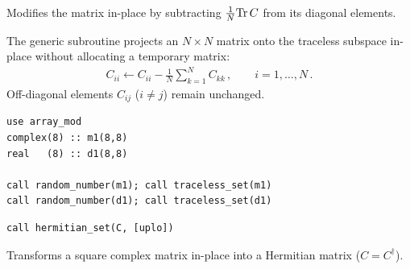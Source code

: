 Modifies the matrix  in-place by subtracting $\frac{1}{N}{\rm Tr\,} C$ from its diagonal elements.

The generic subroutine  projects an $N\times N$ matrix  onto the traceless subspace in-place without allocating a temporary matrix:
\begin{align}
  C_{ii} \leftarrow C_{ii} - \frac{1}{N}\sum_{k=1}^{N} C_{kk}\, , \qquad i = 1,\ldots,N\, .
\end{align}
Off-diagonal elements $C_{ij}$ ($i\neq j$) remain unchanged.

\begin{description}[leftmargin=2.2cm, style=nextline]
\end{description}

\lstset{language=[95]Fortran}
\begin{lstlisting}
use array_mod
complex(8) :: m1(8,8)
real   (8) :: d1(8,8)

call random_number(m1); call traceless_set(m1)
call random_number(d1); call traceless_set(d1)
\end{lstlisting}


\lstset{language=[95]Fortran}
\begin{lstlisting}
call hermitian_set(C, [uplo])
\end{lstlisting}

Transforms a square complex matrix  in-place into a Hermitian matrix ($C = C^\dagger$).

